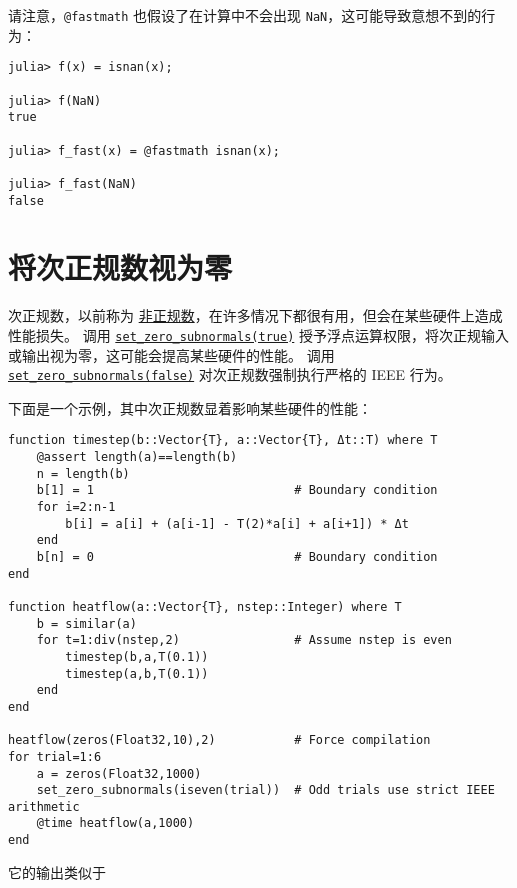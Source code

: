 请注意，\texttt{@fastmath} 也假设了在计算中不会出现 \texttt{NaN}，这可能导致意想不到的行为：




\begin{verbatim}
julia> f(x) = isnan(x);

julia> f(NaN)
true

julia> f_fast(x) = @fastmath isnan(x);

julia> f_fast(NaN)
false
\end{verbatim}



\hypertarget{7419573372551608522}{}


\section{将次正规数视为零}



次正规数，以前称为 \href{https://en.wikipedia.org/wiki/Denormal\_number}{非正规数}，在许多情况下都很有用，但会在某些硬件上造成性能损失。 调用 \hyperlink{2845950135157372113}{\texttt{set\_zero\_subnormals(true)}} 授予浮点运算权限，将次正规输入或输出视为零，这可能会提高某些硬件的性能。 调用 \hyperlink{2845950135157372113}{\texttt{set\_zero\_subnormals(false)}} 对次正规数强制执行严格的 IEEE 行为。



下面是一个示例，其中次正规数显着影响某些硬件的性能：




\begin{verbatim}
function timestep(b::Vector{T}, a::Vector{T}, Δt::T) where T
    @assert length(a)==length(b)
    n = length(b)
    b[1] = 1                            # Boundary condition
    for i=2:n-1
        b[i] = a[i] + (a[i-1] - T(2)*a[i] + a[i+1]) * Δt
    end
    b[n] = 0                            # Boundary condition
end

function heatflow(a::Vector{T}, nstep::Integer) where T
    b = similar(a)
    for t=1:div(nstep,2)                # Assume nstep is even
        timestep(b,a,T(0.1))
        timestep(a,b,T(0.1))
    end
end

heatflow(zeros(Float32,10),2)           # Force compilation
for trial=1:6
    a = zeros(Float32,1000)
    set_zero_subnormals(iseven(trial))  # Odd trials use strict IEEE arithmetic
    @time heatflow(a,1000)
end
\end{verbatim}



它的输出类似于




